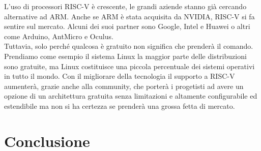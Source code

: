 \documentclass[12pt,a4paper]{report}
\begin{document}
L’uso di processori RISC-V è crescente,  le grandi aziende stanno già cercando alternative ad ARM. Anche se ARM è stata acquisita da  NVIDIA,  RISC-V si fa sentire sul mercato. Alcuni dei suoi partner sono Google, Intel e Huawei o altri come Arduino, AntMicro e Oculus.  \\

Tuttavia, solo perché qualcosa è gratuito non significa che prenderà il comando. Prendiamo come esempio il sistema Linux la maggior parte delle distribuzioni sono gratuite, ma Linux costituisce una piccola percentuale dei sistemi operativi in tutto il mondo.   Con il migliorare della tecnologia il supporto a RISC-V aumenterà, grazie anche alla community, che porterà i progetisti ad avere un opzione di un architettura gratuita senza limitazioni e altamente configurabile ed estendibile ma non si ha certezza se prenderà una grossa fetta di mercato.

\chapter{Conclusione}


\printbibliography
\end{document}
